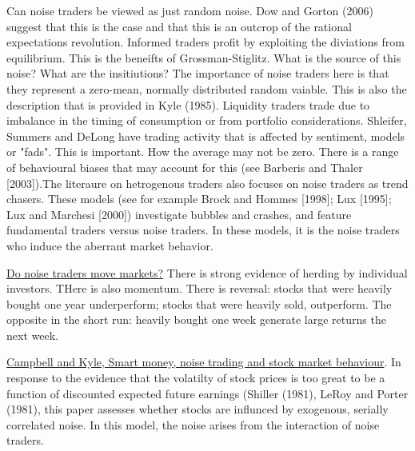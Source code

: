 \documentclass[12pt, a4paper, oneside]{article} %
\begin{document}
Can noise traders be viewed as just random noise.  Dow and Gorton (2006) suggest that this is the case and that this is an outcrop of the rational expectations revolution. Informed traders profit by exploiting the diviations from equilibrium. This is the beneifts of Grossman-Stiglitz. What is the source of this noise?  What are the insitiutions? The importance of noise traders here is that they represent a zero-mean, normally distributed random vaiable.  This is also the description that is provided in Kyle (1985).  Liquidity traders trade due to imbalance in the timing of consumption or from portfolio considerations. Shleifer, Summers and DeLong have trading activity that is affected by sentiment, models or "fads".  This is important.  How the average may not be zero. There is a range of behavioural biases that may account for this (see Barberis and Thaler [2003]).The literaure on hetrogenous traders also focuses on noise traders as trend chasers.  These models (see for example Brock and Hommes [1998]; Lux [1995]; Lux and Marchesi [2000]) investigate bubbles and crashes, and feature fundamental traders versus noise traders. In these models, it is the noise traders who 
induce the aberrant market behavior.  

\href{http://papers.ssrn.com.ezproxy.liv.ac.uk/sol3/papers.cfm?abstract_id=869827}{Do noise traders move markets?}  There is strong evidence of herding by individual investors. THere is also momentum. There is reversal:  stocks that were heavily bought one year underperform; stocks that were heavily sold, outperform. The opposite in the short run:  heavily bought one week generate large returns the next week. 

\href{http://restud.oxfordjournals.org.ezproxy.liv.ac.uk/content/60/1/1.full.pdf+html}{Campbell and Kyle, Smart money, noise trading and stock market behaviour}. In response to the evidence that the volatilty of stock prices is too great to be a function of discounted expected future earnings (Shiller (1981),  LeRoy and Porter (1981), this paper assesses whether stocks are influnced by exogenous, serially correlated noise. In this model, the noise arises from the interaction of noise traders. 
\end{document}
